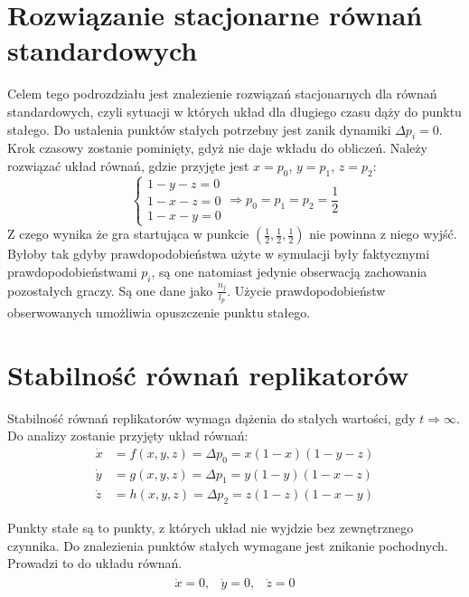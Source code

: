 \section{Rozwiązanie stacjonarne równań standardowych}
\label{sec:stab_stand}
Celem tego podrozdziału jest znalezienie rozwiązań stacjonarnych dla równań standardowych, czyli sytuacji w których układ dla długiego czasu dąży do punktu stałego. Do ustalenia punktów stałych potrzebny jest zanik dynamiki $\Delta p_i = 0$. Krok czasowy zostanie pominięty, gdyż nie daje wkładu do obliczeń. Należy rozwiązać układ równań, gdzie przyjęte jest $x=p_0$, $y=p_1$, $z=p_2$:
\begin{equation}
\left\{
\begin{array}{c}
1 - y - z = 0 \\
1 - x - z = 0 \\
1 - x - y = 0
\end{array}
\right. \Rightarrow p_0 = p_1 = p_2 = \frac{1}{2}
\end{equation}
Z czego wynika że gra startująca w punkcie $(\frac{1}{2},\frac{1}{2},\frac{1}{2})$ nie powinna z niego wyjść. Byłoby tak gdyby prawdopodobieństwa użyte w symulacji były faktycznymi prawdopodobieństwami $p_i$, są one natomiast jedynie obserwacją zachowania pozostałych graczy. Są one dane jako $\frac{n_j}{l_p}$. Użycie prawdopodobieństw obserwowanych umożliwia opuszczenie punktu stałego.

\section{Stabilność równań replikatorów}
\label{sec:stab_repl}
Stabilność równań replikatorów \cite{Sss} wymaga dążenia do stałych wartości, gdy $t\Rightarrow \infty$. Do analizy zostanie przyjęty układ równań:
\begin{align}\label{eq:stab_uklad_analiza}
\dot{x} &= f(x,y,z) = \Delta p_0 = x(1-x)(1-y-z)\nonumber\\
\dot{y} &= g(x,y,z) = \Delta p_1 = y(1-y)(1-x-z)\\
\dot{z} &= h(x,y,z) = \Delta p_2 = z(1-z)(1-x-y)\nonumber
\end{align}

Punkty stałe są to punkty, z których układ nie wyjdzie bez zewnętrznego czynnika. Do znalezienia punktów stałych wymagane jest znikanie pochodnych. Prowadzi to do układu równań.
\begin{align}
\begin{array}{ccc}
\dot{x} = 0, & \dot{y} = 0, & \dot{z} = 0
\end{array}
\end{align}

